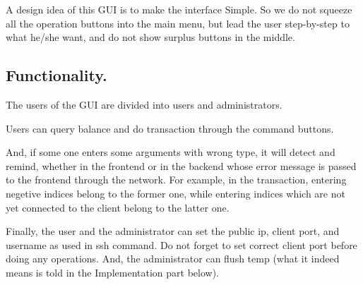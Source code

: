 \documentclass[12pt]{article}
\begin{document}
A design idea of this GUI is to make the interface Simple. So we do not squeeze all the operation buttons into the main menu, but lead the user step-by-step to what he/she want, and do not show surplus buttons in the middle.

\subsection*{Functionality.}

The users of the GUI are divided into users and administrators.

Users can query balance and do transaction through the command buttons. 


And, if some one enters some arguments with wrong type, it will detect and remind, whether in the frontend or in the backend whose error message is passed to the frontend through the network. For example, in the transaction, entering negetive indices belong to the former one, while entering indices which are not yet connected to the client belong to the latter one. 


Finally, the user and the administrator can set the public ip, client port, and username as used in ssh command. Do not forget to set correct client port before doing any operations. And, the administrator can flush temp (what it indeed means is told in the Implementation part below). 
\end{document}
